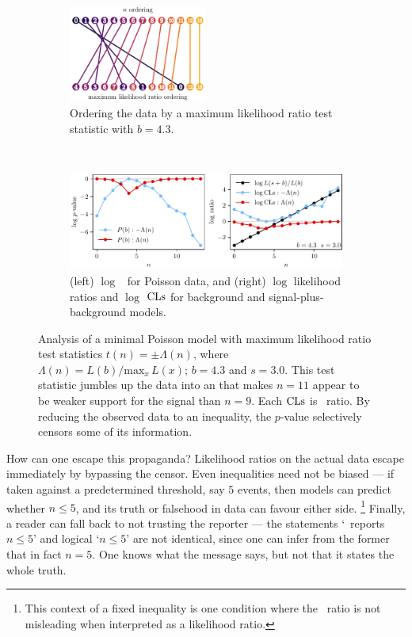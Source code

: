\begin{figure}[tp]
\centering
\begin{subfigure}{\textwidth}
\centering
\includegraphics[width=0.5\textwidth]{figures/searches_cls_plots_with_pvals_order.pdf}
\caption{%
Ordering the data by a maximum likelihood ratio test statistic with $b=4.3$.
}
\end{subfigure}
\\[.5em]
\begin{subfigure}{\textwidth}
\centering
\includegraphics[width=\textwidth]{figures/searches_cls_plots_with_pvals_t.pdf}
\caption{%
(left) $\log$ \pvalues\ for Poisson data,
and (right) $\log$ likelihood ratios and $\log$ $\mathrm{CLs}$ for
background and signal-plus-background models.%
}
\end{subfigure}
\caption[
Analysis of a minimal Poisson model with maximum likelihood ratio
test statistics
]{%
Analysis of a minimal Poisson model with maximum likelihood ratio
test statistics $t(n) = \pm \Lambda(n)$,
where $\Lambda(n) = L(b)/\mathrm{max}_x\,L(x)$; $b = 4.3$ and $s = 3.0$.
This test statistic jumbles up the data into an that makes $n=11$ appear to be
weaker support for the signal than $n=9$.
Each $\mathrm{CLs}$ is \pvalue\ ratio.
By reducing the observed data to an inequality, the $p$-value selectively
censors some of its information.
}
\label{fig:searches_sb_t}
\end{figure}

How can one escape this propaganda?
Likelihood ratios on the actual data escape immediately by bypassing the
censor.
Even inequalities need not be biased --- if taken against a predetermined
threshold, say $5$ events, then models can predict whether $n \leq 5$,
and its truth or falsehood in data can favour either side.%
\footnote{%
This context of a fixed inequality is one condition where the
\pvalue\ ratio is not misleading when interpreted as a likelihood ratio.%
}
Finally, a reader can fall back to not trusting the reporter ---
the statements `\atlas\ reports $n \leq 5$' and logical `$n \leq 5$' are not
identical, since one can infer from the former that in fact $n = 5$.
One knows what the message says, but not that it states the whole truth.

